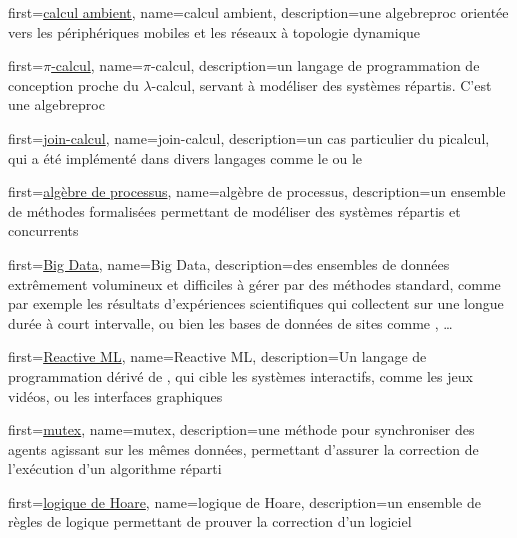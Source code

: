 {
	first={\underline{calcul ambient}},
	name={calcul ambient}, 
	description={une \gls{algebreproc} orientée vers les périphériques mobiles et les réseaux à topologie dynamique}
}

{
	first={\underline{$\pi$-calcul}},
	name={$\pi$-calcul},
	description={un langage de programmation de conception proche du $\lambda$-calcul, servant à modéliser des systèmes répartis. C'est une \gls{algebreproc}}	
}

{
	first={\underline{join-calcul}},
	name={join-calcul}, 
	description={un cas particulier du \gls{picalcul}, qui a été implémenté dans divers langages comme le  ou le }
}

{
	first={\underline{algèbre de processus}},
	name={algèbre de processus},
	description={un ensemble de méthodes formalisées permettant de modéliser des systèmes répartis et concurrents}
}

{
	first={\underline{Big Data}},
	name={Big Data},
	description={des ensembles de données extrêmement volumineux et difficiles à gérer par des méthodes standard, comme par exemple les résultats d'expériences scientifiques qui collectent sur une longue durée à court intervalle, ou bien les bases de données de sites comme , \dots}
}

{
	first={\underline{Reactive ML}},
	name={Reactive ML},
	description={Un langage de programmation dérivé de , qui cible les systèmes interactifs, comme les jeux vidéos, ou les interfaces graphiques}	
}

{
	first={\underline{mutex}},
	name=mutex,
	description={une méthode pour synchroniser des agents agissant sur les mêmes données, permettant d'assurer la correction de l'exécution d'un algorithme réparti}	
}

{
	first={\underline{logique de Hoare}},
	name={logique de Hoare},
	description={un ensemble de règles de logique permettant de prouver la correction d'un logiciel}
}